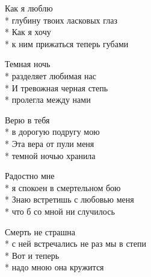 \medskip

\begin{minipage}{\linewidth}
Как я люблю\\*
глубину твоих ласковых глаз\\*
Как я хочу\\*
к ним прижаться теперь губами\\
\end{minipage}\par\medskip\nobreak

\medskip

\begin{minipage}{\linewidth}
Темная ночь\\*
разделяет любимая нас\\*
И тревожная черная степь\\*
пролегла между нами\\
\end{minipage}\par\medskip\nobreak

\medskip

\begin{minipage}{\linewidth}
Верю в тебя\\*
в дорогую подругу мою\\*
Эта вера от пули меня\\*
темной ночью хранила\\
\end{minipage}\par\medskip\nobreak

\medskip

\begin{minipage}{\linewidth}
Радостно мне\\*
я спокоен в смертельном бою\\*
Знаю встретишь с любовью меня\\*
что б со мной ни случилось\\
\end{minipage}\par\medskip\nobreak

\medskip

\begin{minipage}{\linewidth}
Смерть не страшна\\*
с ней встречались не раз мы в степи\\*
Вот и теперь\\*
надо мною она кружится\\
\end{minipage}\par\medskip\nobreak

